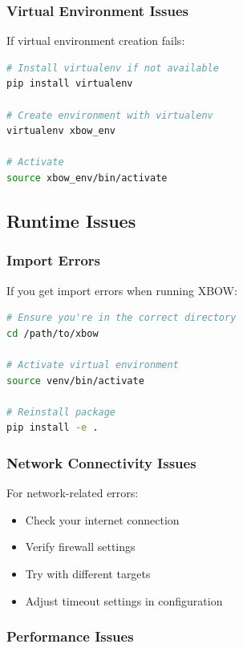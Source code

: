 \documentclass[12pt,a4paper]{report}
\begin{document}
\subsubsection{Virtual Environment Issues}

If virtual environment creation fails:

\begin{lstlisting}[language=bash]
# Install virtualenv if not available
pip install virtualenv

# Create environment with virtualenv
virtualenv xbow_env

# Activate
source xbow_env/bin/activate
\end{lstlisting}

\subsection{Runtime Issues}

\subsubsection{Import Errors}

If you get import errors when running XBOW:

\begin{lstlisting}[language=bash]
# Ensure you're in the correct directory
cd /path/to/xbow

# Activate virtual environment
source venv/bin/activate

# Reinstall package
pip install -e .
\end{lstlisting}

\subsubsection{Network Connectivity Issues}

For network-related errors:

\begin{itemize}
    \item Check your internet connection
    \item Verify firewall settings
    \item Try with different targets
    \item Adjust timeout settings in configuration
\end{itemize}

\subsubsection{Performance Issues}
\end{document}
